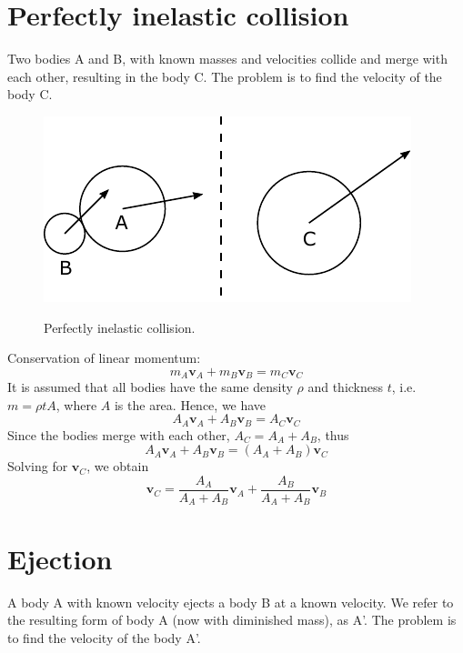 \documentclass{article}
\newcommand{\vbs}[0]{\boldsymbol{v}}
\begin{document}
\section{Perfectly inelastic collision}
Two bodies A and B, with known masses and velocities collide and merge with each other, resulting in the body C. The problem is to find the velocity of the body C.

\begin{figure}[h]
	\centering
	{\includegraphics{figures/perfectly_inelastic_collision.pdf}}
	\caption{Perfectly inelastic collision.}\label{fig:perfectly_inelastic_collision}
\end{figure}

Conservation of linear momentum:
\begin{equation*}
m_A\vbs_A + m_B\vbs_B = m_C\vbs_C
\end{equation*}
It is assumed that all bodies have the same density $\rho$ and thickness $t$, i.e. $m = \rho t A$, where $A$ is the area. Hence, we have
\begin{equation*}
A_A\vbs_A + A_B\vbs_B = A_C\vbs_C
\end{equation*}
Since the bodies merge with each other, $A_C = A_A + A_B$, thus
\begin{equation*}
A_A\vbs_A + A_B\vbs_B = (A_A + A_B)\vbs_C
\end{equation*}
Solving for $\vbs_C$, we obtain
\begin{equation}
\label{eq:perfectly_inelastic_collision}
\vbs_C = \frac{A_A}{A_A + A_B}\vbs_A + \frac{A_B}{A_A + A_B}\vbs_B
\end{equation}

\section{Ejection}
A body A with known velocity ejects a body B at a known velocity. We refer to the resulting form of body A (now with diminished mass), as A'. The problem is to find the velocity of the body A'.
\end{document}
